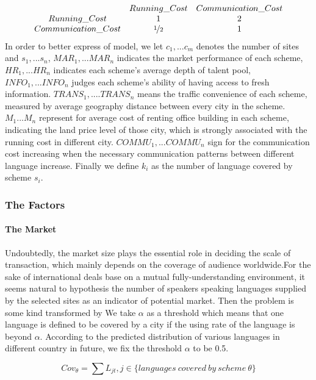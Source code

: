 \documentclass{mcmthesis}
\begin{document}
\begin{align*}
\begin{matrix}
    &Running\_Cost&Communication\_Cost\\
    Running\_Cost&1&2\\
    Communication\_Cost&\nicefrac{1}{2}&1
\end{matrix}
\end{align*}
In order to better express of model, we let $c_1,...c_m$ denotes the number of sites and $s_1,...s_n$, $MAR_1,...MAR_n$ indicates the market performance of each scheme, $HR_1,...HR_n$ indicates each scheme's average depth of talent pool, $INFO_1,...INFO_n$ judges each scheme's ability of having access to fresh information. $TRANS_1,....TRANS_n$ means the traffic convenience of each scheme, measured by average geography distance between every city in the scheme. $M_1...M_n$ represent for average cost of renting office building in each scheme, indicating the land price level of those city, which is strongly associated with the running cost in different city. $COMMU_1,...COMMU_n$ sign for the communication cost increasing when the necessary communication patterns between different language increase. Finally we define $k_i$ as the number of language covered by scheme $s_i$.

\subsubsection{The Factors}
\paragraph{The Market}
Undoubtedly, the market size plays the essential role in deciding the scale of transaction, which mainly depends on the coverage of audience worldwide.For the sake of international deals base on a mutual fully-understanding environment, it seems natural to hypothesis the number of speakers speaking languages supplied by the selected sites as an indicator of potential market. Then the problem is some kind transformed by We take $\alpha$ as a threshold which means that one language is defined to be covered by a city if the using rate of the language is beyond $\alpha$. According to the predicted distribution of various languages in different country in future, we fix the threshold $\alpha$ to be 0.5.

\begin{equation*}
    Cov_\theta=\sum L_{jt}, j\in \{languages\ covered\ by\ scheme\ \theta\}
\end{equation*}
\end{document}
